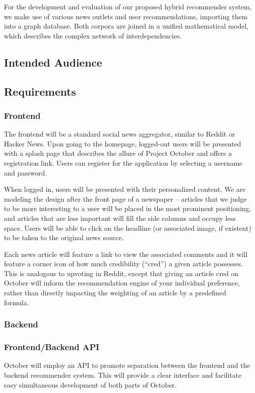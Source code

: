 \documentclass[11pt,letterpaper]{article}
\begin{document}
For the development and evaluation of our proposed hybrid recommender system, we make use of various news outlets and user recommendations, importing them into a graph database.
Both corpora are joined in a unified mathematical model, which describes the complex network of interdependencies.

\subsection{Intended Audience}
\subsection{Requirements}
\subsubsection{Frontend}
The frontend will be a standard social news aggregator, similar to Reddit or Hacker News.
Upon going to the homepage, logged-out users will be presented with a splash page that describes the allure of Project October and offers a registration link.
Users can register for the application by selecting a username and password.

When logged in, users will be presented with their personalized content.
We are modeling the design after the front page of a newspaper -- articles that we judge to be more interesting to a user will be placed in the most prominent positioning, and articles that are less important will fill the side columns and occupy less space.
Users will be able to click on the headline (or associated image, if existent) to be taken to the original news source.

Each news article will feature a link to view the associated comments and it will feature a corner icon of how much credibility (``cred'') a given article possesses.
This is analogous to upvoting in Reddit, except that giving an article cred on October will inform the recommendation engine of your individual preference, rather than directly impacting the weighting of an article by a predefined formula.

\subsubsection{Backend}

\subsubsection{Frontend/Backend API}
October will employ an API to promote separation between the frontend and the backend recommender system.
This will provide a clear interface and facilitate easy simultaneous development of both parts of October.
\end{document}
